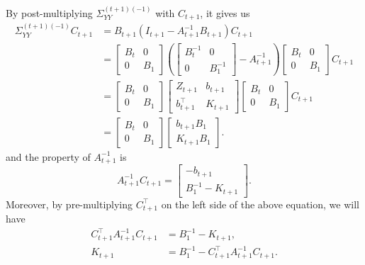 By post-multiplying $\Sigma_{YY}^{(t+1)(-1)}$ with $C_{t+1}$, it gives us
\begin{align*}
\Sigma_{YY}^{(t+1)(-1)} C_{t+1} &=  B_{t+1} (I_{t+1} -A_{t+1} ^{-1}B_{t+1} ) C_{t+1}  \\ 
&= \begin{bmatrix} B_t & 0 \\ 0 & B_1 \end{bmatrix} \left( \begin{bmatrix} B_t^{-1} & 0 \\ 0 & B_1^{-1} \end{bmatrix}  -A_{t+1}^{-1} \right) \begin{bmatrix} B_t & 0 \\ 0 & B_1 \end{bmatrix}   C_{t+1}\\
&= \begin{bmatrix} B_t & 0 \\ 0 & B_1 \end{bmatrix}\begin{bmatrix} Z_{t+1} & b_{t+1} \\ b_{t+1}^\top  & K_{t+1} \end{bmatrix}  \begin{bmatrix} B_t & 0 \\ 0 & B_1 \end{bmatrix}   C_{t+1}\\
& = \begin{bmatrix} B_t & 0 \\ 0 & B_1 \end{bmatrix}\begin{bmatrix} b_{t+1}B_1\\ K_{t+1}B_1 \end{bmatrix}.
\end{align*}
and the property of $A_{t+1}^{-1}$ is 
\begin{equation*}
A_{t+1}^{-1}C_{t+1} = \begin{bmatrix}
-b_{t+1} \\ B_1^{-1} - K_{t+1}
\end{bmatrix}.
\end{equation*}
Moreover, by pre-multiplying $C_{t+1}^\top$ on the left side of the above equation, we will have 
\begin{align}
C_{t+1}^\top A_{t+1}^{-1}C_{t+1}  &= B_1^{-1} -K_{t+1},\\
K_{t+1} &= B_1^{-1} - C_{t+1}^\top A_{t+1}^{-1}C_{t+1}.\label{OUKtp1}
\end{align}



